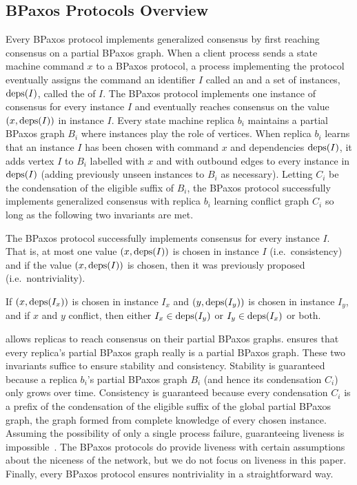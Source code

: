 \subsection{BPaxos Protocols Overview}
Every BPaxos protocol implements generalized consensus by first reaching
consensus on a partial BPaxos graph.
%
When a client process sends a state machine command $x$ to a BPaxos protocol, a
process implementing the protocol eventually assigns the command an identifier
$I$ called an  and a set of instances, $\text{deps}(I)$, called the
 of $I$.
%
The BPaxos protocol implements one instance of consensus for every instance $I$
and eventually reaches consensus on the value $(x, \text{deps}(I))$ in instance $I$.
Every state machine replica $b_i$ maintains a partial BPaxos graph $B_i$ where
instances play the role of vertices. When replica $b_i$ learns that an instance
$I$ has been chosen with command $x$ and dependencies $\text{deps}(I)$, it adds
vertex $I$ to $B_i$ labelled with $x$ and with outbound edges to every instance
in $\text{deps}(I)$ (adding previously unseen instances to $B_i$ as necessary).
Letting $C_i$ be the condensation of the eligible suffix of $B_i$, the BPaxos
protocol successfully implements generalized consensus with replica $b_i$
learning conflict graph $C_i$ so long as the following two invariants are met.

\begin{invariant}
  The BPaxos protocol successfully implements consensus for every instance $I$.
  That is, at most one value $(x, \text{deps}(I))$ is chosen in instance $I$ (i.e.\
  consistency) and if the value $(x, \text{deps}(I))$ is chosen, then it was
  previously proposed (i.e.\ nontriviality).
\end{invariant}
\begin{invariant}
  If $(x, \text{deps}(I_x))$ is chosen in instance $I_x$ and $(y, \text{deps}(I_y))$ is
  chosen in instance $I_y$, and if $x$ and $y$ conflict, then either $I_x \in
  \text{deps}(I_y)$ or $I_y \in \text{deps}(I_x)$ or both.
\end{invariant}

 allows replicas to reach consensus on their partial
BPaxos graphs. \invref{ConflictInvariant} ensures that every replica's partial
BPaxos graph really is a partial BPaxos graph.
%
These two invariants suffice to ensure stability and consistency. Stability is
guaranteed because a replica $b_i$'s partial BPaxos graph $B_i$ (and hence its
condensation $C_i$) only grows over time. Consistency is guaranteed because
every condensation $C_i$ is a prefix of the condensation of the eligible suffix
of the global partial BPaxos graph, the graph formed from complete knowledge of
every chosen instance.
%
Assuming the possibility of only a single process failure, guaranteeing
liveness is impossible~\cite{fischer1982impossibility}. The BPaxos protocols do
provide liveness with certain assumptions about the niceness of the network,
but we do not focus on liveness in this paper. Finally, every BPaxos protocol
ensures nontriviality in a straightforward way.

